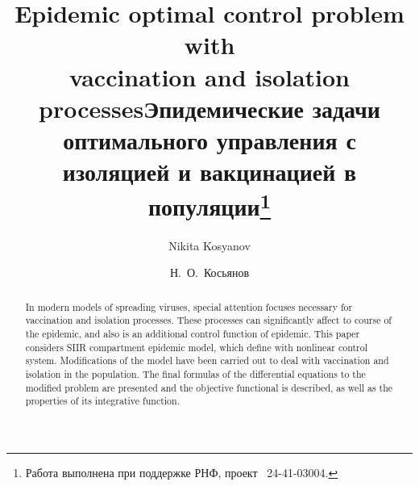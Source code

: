 \begin{englishtitle}
\title{Epidemic optimal control problem with\\ vaccination and isolation processes}
\author{Nikita Kosyanov}

\maketitle

\begin{abstract}
In modern models of spreading viruses, special attention focuses necessary for vaccination and isolation processes. These processes can significantly affect to course of the epidemic, and also is an additional control function of epidemic. This paper considers SIIR compartment epidemic model, which define with nonlinear control system. Modifications of the model have been carried out to deal with vaccination and isolation in the population. The final formulas of the differential equations to the modified problem are presented and the objective functional is described, as well as the properties of its integrative function.

\end{abstract}
\end{englishtitle}

\iffalse
\documentclass[12pt]{llncs}
\usepackage[T2A]{fontenc}
\usepackage[utf8]{inputenc}
\usepackage[english,russian]{babel}
\usepackage[russian]{nla}




\fi

\title{Эпидемические задачи оптимального управления с изоляцией и вакцинацией в популяции\thanks{Работа выполнена при поддержке РНФ, проект \textnumero~24-41-03004.}}
\author{Н.~О.~Косьянов
} %

